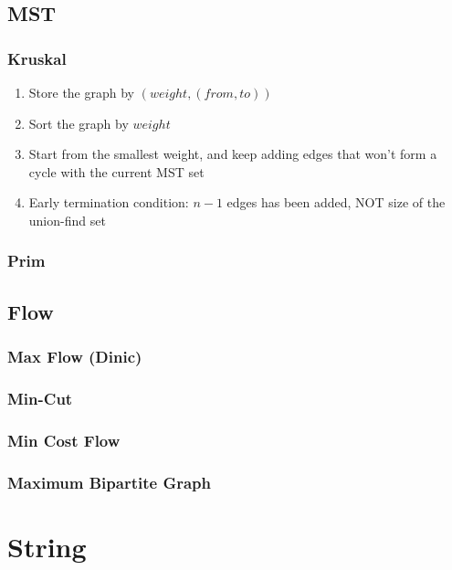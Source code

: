 \documentclass[10pt,oneside]{article}
\begin{document}
\begin{landscape}
\begin{multicols}{2}
\subsection{MST}

\subsubsection{Kruskal}

\begin{enumerate}
	\item Store the graph by $(weight, (from , to))$
	\item Sort the graph by $weight$ 
	\item Start from the smallest weight, and keep adding edges that won't form a cycle with the current MST set
	\item Early termination condition: $n - 1$ edges has been added, NOT size of the union-find set
\end{enumerate}

\subsubsection{Prim}

\subsection{Flow}

\subsubsection{Max Flow (Dinic)}

\subsubsection{Min-Cut}

\subsubsection{Min Cost Flow}

\subsubsection{Maximum Bipartite Graph}


\section{String}


\end{multicols}
\end{landscape}
\end{document}
